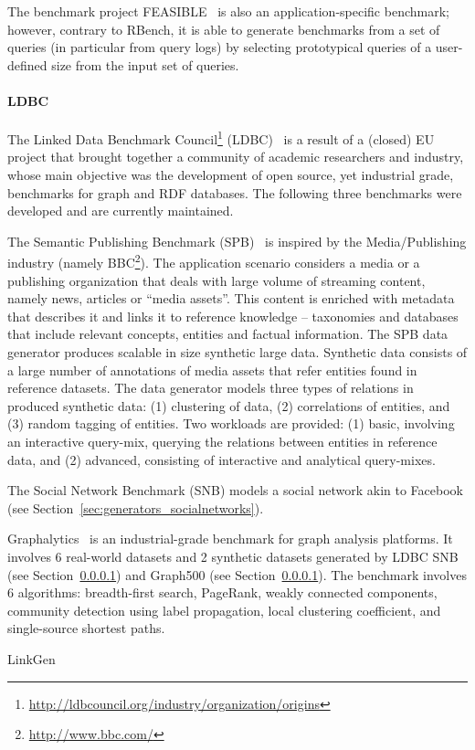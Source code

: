 The benchmark project FEASIBLE~\cite{Saleem2015} is also an application-specific benchmark; however, contrary to RBench, it is able to generate benchmarks from a set of queries (in particular from query logs) by selecting prototypical queries of a user-defined
size from the input set of queries.


\paragraph{LDBC}  The Linked Data Benchmark Council\footnote{\url{http://ldbcouncil.org/industry/organization/origins}} (LDBC)~\cite{Angles:2014:LDB:2627692.2627697} is a result of a (closed) EU project that brought together a community of academic researchers and industry, whose main objective was the development of open source, yet industrial grade, benchmarks for graph and RDF databases. The following three benchmarks were developed and are currently maintained.


The Semantic Publishing Benchmark (SPB)~\cite{spb} is inspired by the Media/Publishing industry (namely BBC\footnote{\url{http://www.bbc.com/}}). The application scenario considers a media or a publishing organization that deals with large volume of streaming content, namely news, articles or  ``media assets''. This content is enriched with metadata that describes it and links it to reference knowledge -- taxonomies and databases that include relevant concepts, entities and factual information. The SPB data generator produces scalable in size synthetic large data. Synthetic data consists of a large number of annotations of media assets that refer entities found in reference datasets. The data generator models three types of relations in produced synthetic data: (1) clustering of data, (2) correlations of entities, and (3) random tagging of entities. Two workloads are provided: (1) basic, involving an interactive query-mix, querying the relations between entities in reference data, and (2) advanced,  consisting of interactive and analytical query-mixes.

The Social Network Benchmark (SNB) models a social network akin to Facebook (see Section~\ref{sec:generators_socialnetworks}).

Graphalytics~\cite{Iosup:2016:LGB:3007263.3007270} is an industrial-grade benchmark for graph analysis platforms. It involves 6 real-world datasets and 2 synthetic datasets generated by LDBC SNB (see Section~\ref{}) and Graph500 (see Section~\ref{}). The benchmark involves 6 algorithms: breadth-first search, PageRank, weakly connected components, community detection using label propagation, local clustering coefficient, and single-source shortest paths. 

LinkGen~\cite{10.1007/978-3-319-46547-0_12}


